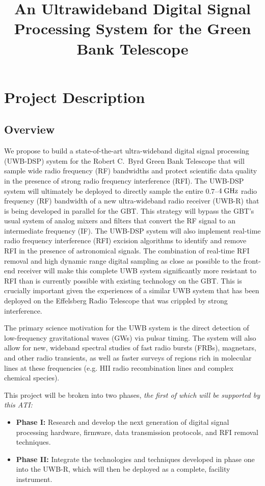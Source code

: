 \documentclass[10pt]{myNSF}
\begin{document}
\title{An Ultrawideband Digital Signal Processing System for the Green
  Bank Telescope}
\maketitle

\section{Project Description}
\label{sec:project_description}

\subsection{Overview}
\label{sec:overview}

We propose to build a state-of-the-art ultra-wideband digital signal
processing (UWB-DSP) system for the Robert C.\ Byrd Green Bank
Telescope that will sample wide radio frequency (RF) bandwidths and
protect scientific data quality in the presence of strong radio
frequency interference (RFI).  The UWB-DSP system will ultimately be
deployed to directly sample the entire $0.7$--$4\; \textrm{GHz}$ radio
frequency (RF) bandwidth of a new ultra-wideband radio receiver
(UWB-R) that is being developed in parallel for the GBT.  This
strategy will bypass the GBT's usual system of analog mixers and
filters that convert the RF signal to an intermediate frequency (IF).
The UWB-DSP system will also implement real-time radio frequency
interference (RFI) excision algorithms to identify and remove RFI in
the presence of astronomical signals.  The combination of real-time
RFI removal and high dynamic range digital sampling as close as
possible to the front-end receiver will make this complete UWB system
significantly more resistant to RFI than is currently possible with
existing technology on the GBT.  This is crucially important given the
experiences of a similar UWB system that has been deployed on the
Effelsberg Radio Telescope that was crippled by strong interference.

The primary science motivation for the UWB system is the direct
detection of low-frequency gravitational waves (GWs) via pulsar
timing.  The system will also allow for new, wideband spectral studies
of fast radio bursts (FRBs), magnetars, and other radio transients, as
well as faster surveys of regions rich in molecular lines at these
frequencies (e.g. H{\sc II} radio recombination lines and complex
chemical species).  

This project will be broken into two phases, \emph{the first of which
  will be supported by this ATI:}
\begin{itemize}
\item{\textbf{Phase {\sc I}:} Research and develop the next generation
    of digital signal processing hardware, firmware, data transmission
    protocols, and RFI removal techniques.}
\item{\textbf{Phase {\sc II}:} Integrate the technologies and
    techniques developed in phase one into the UWB-R, which will then
    be deployed as a complete, facility instrument.}
\end{itemize}
\end{document}
